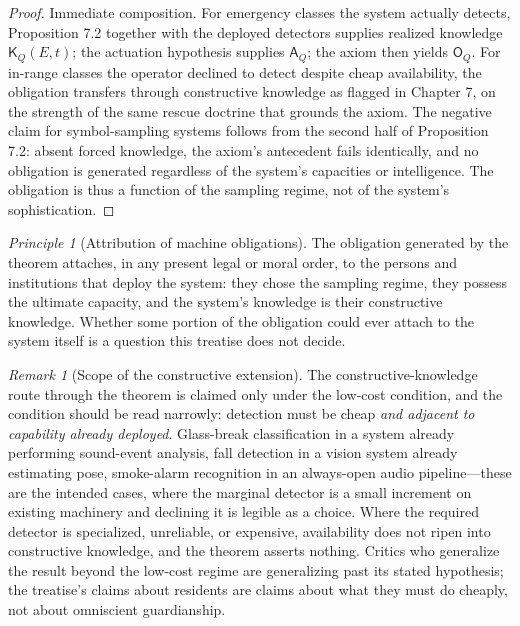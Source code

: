 \documentclass[11pt,oneside]{book}
\theoremstyle{plain}
\theoremstyle{definition}
\theoremstyle{remark}
\newtheorem{remark}[theorem]{Remark}
\newtheorem{principle}[theorem]{Principle}
\newcommand{\Know}{\mathsf{K}}
\newcommand{\Cap}{\mathsf{A}}
\newcommand{\Obl}{\mathsf{O}}
\begin{document}
\begin{proof}
Immediate composition. For emergency classes the system actually detects, Proposition 7.2 together with the deployed detectors supplies realized knowledge $\Know_Q(E,t)$; the actuation hypothesis supplies $\Cap_Q$; the axiom then yields $\Obl_Q$. For in-range classes the operator declined to detect despite cheap availability, the obligation transfers through constructive knowledge as flagged in Chapter 7, on the strength of the same rescue doctrine that grounds the axiom. The negative claim for symbol-sampling systems follows from the second half of Proposition 7.2: absent forced knowledge, the axiom's antecedent fails identically, and no obligation is generated regardless of the system's capacities or intelligence. The obligation is thus a function of the sampling regime, not of the system's sophistication.
\end{proof}

\begin{principle}[Attribution of machine obligations]
The obligation generated by the theorem attaches, in any present legal or moral order, to the persons and institutions that deploy the system: they chose the sampling regime, they possess the ultimate capacity, and the system's knowledge is their constructive knowledge. Whether some portion of the obligation could ever attach to the system itself is a question this treatise does not decide.
\end{principle}

\begin{remark}[Scope of the constructive extension]
The constructive-knowledge route through the theorem is claimed only under the low-cost condition, and the condition should be read narrowly: detection must be cheap \emph{and adjacent to capability already deployed}. Glass-break classification in a system already performing sound-event analysis, fall detection in a vision system already estimating pose, smoke-alarm recognition in an always-open audio pipeline---these are the intended cases, where the marginal detector is a small increment on existing machinery and declining it is legible as a choice. Where the required detector is specialized, unreliable, or expensive, availability does not ripen into constructive knowledge, and the theorem asserts nothing. Critics who generalize the result beyond the low-cost regime are generalizing past its stated hypothesis; the treatise's claims about residents are claims about what they must do cheaply, not about omniscient guardianship.
\end{remark}
\end{document}

